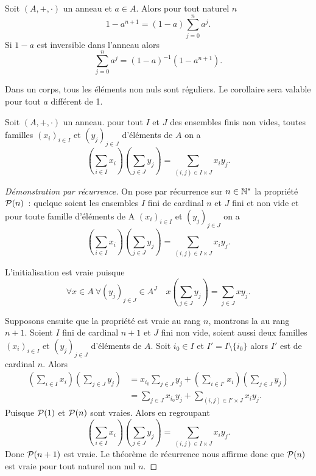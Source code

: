 \begin{corth}
  Soit \((A,+,\cdot)\) un anneau et \(a \in A\). Alors pour tout naturel \(n\)
  \begin{equation}
    1-a^{n+1}=(1-a)\sum_{j=0}^n a^j.
  \end{equation}
  Si \(1-a\) est inversible dans l'anneau alors
  \begin{equation}
    \sum_{j=0}^n a^j = (1-a)^{-1}(1-a^{n+1}).
  \end{equation}
\end{corth}
Dans un corps, tous les éléments non nuls sont réguliers. Le corollaire sera 
valable pour tout \(a\) différent de 1.

\begin{theo}
  Soit \((A,+,\cdot)\) un anneau. pour tout \(I\) et \(J\) des ensembles finis 
  non vides, toutes familles \((x_i)_{i \in I}\) et \((y_j)_{j \in J}\) 
  d'éléments de \(A\) on a
  \begin{equation}
    \left(\sum_{i \in I} x_i \right)\left(\sum_{j \in J} y_j \right) = 
    \sum_{(i,j)\in I\times J} x_iy_j.
  \end{equation}
\end{theo}
\begin{proof}[Démonstration par récurrence]
  On pose par récurrence sur \(n \in \N^*\) la propriété \(\P(n)\)~: quelque 
  soient les ensembles \(I\) fini de cardinal \(n\) et \(J\) fini et non vide et 
  pour toute famille d'éléments de A \((x_i)_{i \in I}\) et \((y_j)_{j \in J}\) 
  on a
  \begin{equation} \left(\sum_{i \in I} x_i \right)\left(\sum_{j \in J} y_j 
    \right) = \sum_{(i,j)\in I\times J} x_iy_j.
  \end{equation}

  L'initialisation est vraie puisque
  \begin{equation}
    \forall x \in A \ \forall (y_j)_{j \in J} \in A^J \quad x \left(\sum_{j \in 
    J} y_j \right) = \sum_{j \in J} xy_j.
  \end{equation}

  Supposons ensuite que la propriété est vraie au rang \(n\), montrons la au 
  rang \(n+1\). Soient \(I\) fini de cardinal \(n+1\) et \(J\) fini non vide, 
  soient aussi deux familles \((x_i)_{i \in I}\) et \((y_j)_{j \in J}\) 
  d'éléments de \(A\). Soit \(i_0 \in I\) et \(I'=I\setminus\{i_0\}\) alors 
  \(I'\) est de cardinal \(n\). Alors
  \begin{align}
    \left(\sum_{i \in I} x_i \right)\left(\sum_{j \in J} y_j \right) &=x_{i_0} 
    \sum_{j \in J} y_j + \left(\sum_{i \in I'} x_i \right)\left(\sum_{j \in J} 
    y_j \right) \\
    &=\sum_{j \in J} x_{i_0}y_j +  \sum_{(i,j)\in I'\times J} x_iy_j.
  \end{align}
  Puisque \(\P(1)\) et \(\P(n)\) sont vraies. Alors en regroupant
  \begin{equation}
    \left(\sum_{i \in I} x_i \right)\left(\sum_{j \in J} y_j \right) = 
    \sum_{(i,j)\in I\times J} x_iy_j.
  \end{equation}
  Donc \(\P(n+1)\) est vraie. Le théorème de récurrence nous affirme donc que 
  \(\P(n)\) est vraie pour tout naturel non nul \(n\).
\end{proof}
